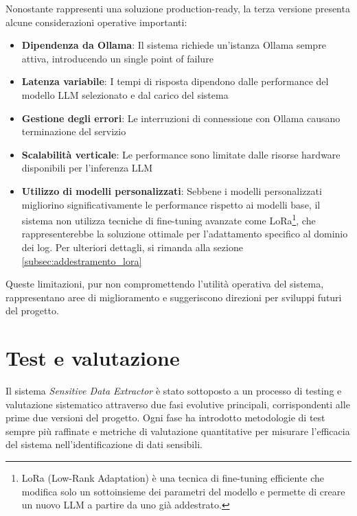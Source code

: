 \documentclass[12pt]{report}
\begin{document}
Nonostante rappresenti una soluzione production-ready, la terza versione presenta alcune considerazioni operative importanti:

\begin{itemize}
    \item \textbf{Dipendenza da Ollama}: Il sistema richiede un'istanza Ollama sempre attiva, introducendo un single point of failure
    \item \textbf{Latenza variabile}: I tempi di risposta dipendono dalle performance del modello LLM selezionato e dal carico del sistema
    \item \textbf{Gestione degli errori}: Le interruzioni di connessione con Ollama causano terminazione del servizio
    \item \textbf{Scalabilità verticale}: Le performance sono limitate dalle risorse hardware disponibili per l'inferenza LLM
    \item \textbf{Utilizzo di modelli personalizzati}: Sebbene i modelli personalizzati migliorino significativamente le performance rispetto ai modelli base, il sistema non utilizza tecniche di fine-tuning avanzate come LoRa\footnote{LoRa (Low-Rank Adaptation) è una tecnica di fine-tuning efficiente che modifica solo un sottoinsieme dei parametri del modello e permette di creare un nuovo LLM a partire da uno già addestrato.}, che rappresenterebbe la soluzione ottimale per l'adattamento specifico al dominio dei log. Per ulteriori dettagli, si rimanda alla sezione \ref{subsec:addestramento_lora}
\end{itemize}

Queste limitazioni, pur non compromettendo l'utilità operativa del sistema, rappresentano aree di miglioramento e suggeriscono direzioni per sviluppi futuri del progetto.



%
%

\chapter{Test e valutazione}
\label{chap:test}

Il sistema \textit{Sensitive Data Extractor} è stato sottoposto a un processo di testing e valutazione sistematico attraverso due fasi evolutive principali, corrispondenti alle prime due versioni del progetto. Ogni fase ha introdotto metodologie di test sempre più raffinate e metriche di valutazione quantitative per misurare l'efficacia del sistema nell'identificazione di dati sensibili.
\end{document}

